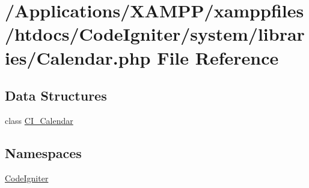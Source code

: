 \hypertarget{_calendar_8php}{}\section{/\+Applications/\+X\+A\+M\+P\+P/xamppfiles/htdocs/\+Code\+Igniter/system/libraries/\+Calendar.php File Reference}
\label{_calendar_8php}
\subsection*{Data Structures}
\begin{DoxyCompactItemize}
\item 
class \mbox{\hyperlink{class_c_i___calendar}{C\+I\+\_\+\+Calendar}}
\end{DoxyCompactItemize}
\subsection*{Namespaces}
\begin{DoxyCompactItemize}
\item 
 \mbox{\hyperlink{namespace_code_igniter}{Code\+Igniter}}
\end{DoxyCompactItemize}
